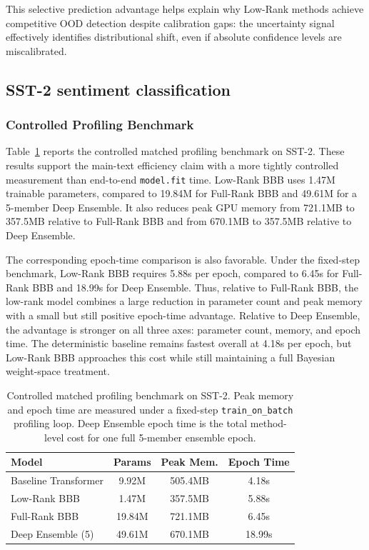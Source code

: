 \documentclass{article}
\theoremstyle{plain}
\theoremstyle{definition}
\theoremstyle{remark}
\begin{document}
This selective prediction advantage helps explain why Low-Rank methods achieve competitive OOD detection despite calibration gaps: the uncertainty signal effectively identifies distributional shift, even if absolute confidence levels are miscalibrated.


\subsection{SST-2 sentiment classification}
\label{app:ext:sst2}
\subsubsection{Controlled Profiling Benchmark}
\label{app:ext:sst2:profiling}

Table~\ref{tab:sst2_profile_appendix} reports the controlled matched profiling benchmark on SST-2. These results support the main-text efficiency claim with a more tightly controlled measurement than end-to-end \texttt{model.fit} time. Low-Rank BBB uses 1.47M trainable parameters, compared to 19.84M for Full-Rank BBB and 49.61M for a 5-member Deep Ensemble. It also reduces peak GPU memory from 721.1MB to 357.5MB relative to Full-Rank BBB and from 670.1MB to 357.5MB relative to Deep Ensemble.

The corresponding epoch-time comparison is also favorable. Under the fixed-step benchmark, Low-Rank BBB requires 5.88s per epoch, compared to 6.45s for Full-Rank BBB and 18.99s for Deep Ensemble. Thus, relative to Full-Rank BBB, the low-rank model combines a large reduction in parameter count and peak memory with a small but still positive epoch-time advantage. Relative to Deep Ensemble, the advantage is stronger on all three axes: parameter count, memory, and epoch time. The deterministic baseline remains fastest overall at 4.18s per epoch, but Low-Rank BBB approaches this cost while still maintaining a full Bayesian weight-space treatment.

\begin{table}[t]
\centering
\caption{Controlled matched profiling benchmark on SST-2. Peak memory and epoch time are measured under a fixed-step \texttt{train\_on\_batch} profiling loop. Deep Ensemble epoch time is the total method-level cost for one full 5-member ensemble epoch.}
\label{tab:sst2_profile_appendix}
\small
\begin{tabular}{lccc}
\toprule
\textbf{Model} & \textbf{Params} & \textbf{Peak Mem.} & \textbf{Epoch Time} \\
\midrule
Baseline Transformer & 9.92M & 505.4MB & 4.18s \\
Low-Rank BBB & 1.47M & 357.5MB & 5.88s \\
Full-Rank BBB & 19.84M & 721.1MB & 6.45s \\
Deep Ensemble (5) & 49.61M & 670.1MB & 18.99s \\
\bottomrule
\end{tabular}
\end{table}
\end{document}
